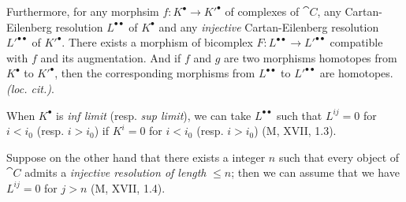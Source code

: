 \begin{env}[11.4.2]
Furthermore, for any morphsim $f: K^\bullet \rightarrow K'^\bullet$ of complexes of $\cat{C}$, 
any Cartan-Eilenberg resolution $L^{\bullet\bullet}$ of $K^\bullet$ and any \emph{injective} Cartan-Eilenberg resolution $L'^{\bullet\bullet}$ of $K'^\bullet$.
There exists a morphism of bicomplex $F: L^{\bullet\bullet} \rightarrow L'^{\bullet\bullet}$ compatible with $f$ and its augmentation.
And if $f$ and $g$ are two morphisms homotopes from $K^\bullet$ to $K'^\bullet$, then the corresponding morphisms from $L^{\bullet\bullet}$ to $L'^{\bullet\bullet}$ are homotopes.
\emph{(loc. cit.)}.

When $K^{\bullet}$ is \emph{inf limit} (resp. \emph{sup limit}), we can take $L^{\bullet\bullet}$ such that $L^{ij}=0$ for $i<i_0$ (resp. $i>i_0$)
if $K^i=0$ for $i<i_0$ (resp. $i>i_0$) (M, XVII, 1.3).

Suppose on the other hand that there exists a integer $n$ such that every object of $\cat{C}$ admits a \emph{injective resolution of length} $\leq n$;
then we can assume that we have $L^{ij}=0$ for $j>n$ (M, XVII, 1.4).
\end{env}


